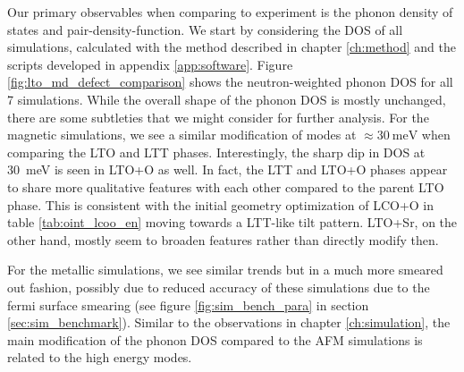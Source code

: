Our primary observables when comparing to experiment is the phonon density of states and pair-density-function. We start by considering the DOS of all simulations, calculated with the method described in chapter \ref{ch:method} and the scripts developed in appendix \ref{app:software}. Figure \ref{fig:lto_md_defect_comparison} shows the neutron-weighted phonon DOS for all 7 simulations. While the overall shape of the phonon DOS is mostly unchanged, there are some subtleties that we might consider for further analysis. For the magnetic simulations, we see a similar modification of modes at $\approx \SI{30}{\milli\eV}$ when comparing the LTO and LTT phases. Interestingly, the sharp dip in DOS at \SI{30}{\milli\eV} is seen in LTO+O as well. In fact, the LTT and LTO+O phases appear to share more qualitative features with each other compared to the parent LTO phase. This is consistent with the initial geometry optimization of LCO+O in table \ref{tab:oint_lcoo_en} moving towards a LTT-like tilt pattern. LTO+Sr, on the other hand, mostly seem to broaden features rather than directly modify then. 

For the metallic simulations, we see similar trends but in a much more smeared out fashion, possibly due to reduced accuracy of these simulations due to the fermi surface smearing (see figure \ref{fig:sim_bench_para} in section \ref{sec:sim_benchmark}). Similar to the observations in chapter \ref{ch:simulation}, the main modification of the phonon DOS compared to the AFM simulations is related to the high energy modes.

